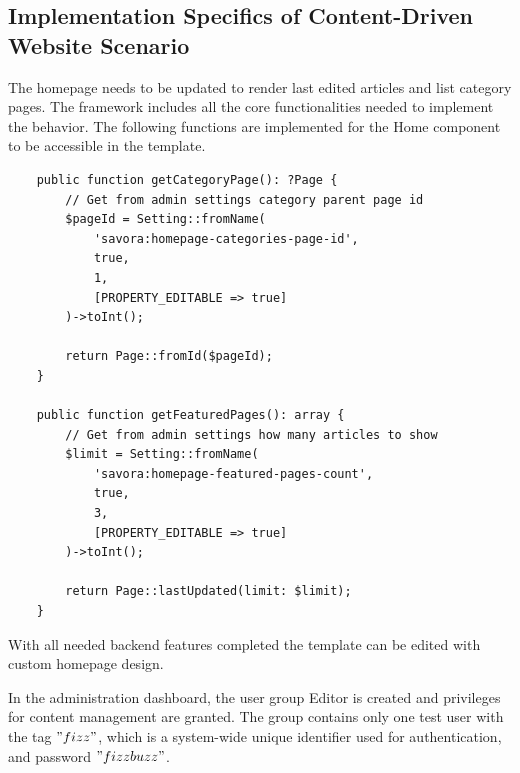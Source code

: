 \subsection{Implementation Specifics of Content-Driven Website Scenario}\label{subsec:implementation-specifics-of-content-driven-website-scenario}
The homepage needs to be updated to render last edited articles and list category pages.
The framework includes all the core functionalities needed to implement the behavior.
The following functions are implemented for the Home component to be accessible in the template.

\begin{verbatim}
    public function getCategoryPage(): ?Page {
        // Get from admin settings category parent page id
        $pageId = Setting::fromName(
            'savora:homepage-categories-page-id',
            true,
            1,
            [PROPERTY_EDITABLE => true]
        )->toInt();

        return Page::fromId($pageId);
    }

    public function getFeaturedPages(): array {
        // Get from admin settings how many articles to show
        $limit = Setting::fromName(
            'savora:homepage-featured-pages-count',
            true,
            3,
            [PROPERTY_EDITABLE => true]
        )->toInt();

        return Page::lastUpdated(limit: $limit);
    }
\end{verbatim}

With all needed backend features completed the template can be edited with custom homepage design.

In the administration dashboard, the user group Editor is created and privileges for content management are granted.
The group contains only one test user with the tag \("fizz"\),
which is a system-wide unique identifier used for authentication, and password \("fizzbuzz"\).